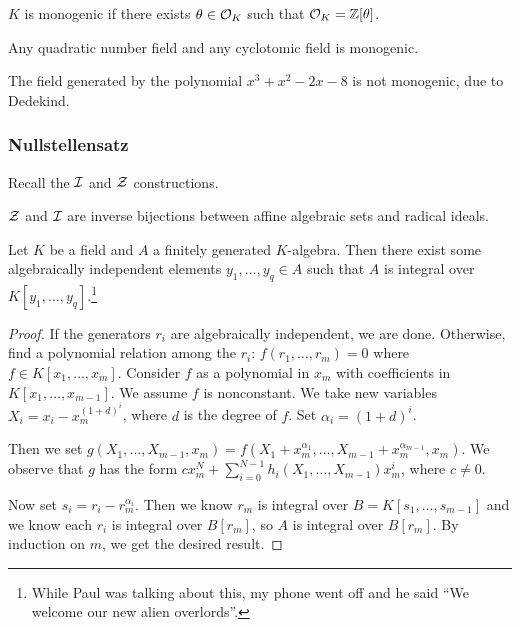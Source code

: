 \documentclass[10pt, twoside]{article}
\begin{document}
        \begin{defn}
            $K$ is monogenic if there exists $\theta \in \mathcal{O}_K$ such that $\mathcal{O}_K = \mathbb{Z}[\theta]$.
        \end{defn}

        \begin{exm}
            Any quadratic number field and any cyclotomic field is monogenic.
        \end{exm}
        \begin{exm}
            The field generated by the polynomial $x^3+x^2-2x-8$ is not monogenic, due to Dedekind.
        \end{exm}

        \subsubsection{Nullstellensatz}
        Recall the $\mathcal{I}$ and $\mathcal{Z}$ constructions.

        \begin{thm}
            $\mathcal{Z}$ and $\mathcal{I}$ are inverse bijections between affine algebraic sets and radical ideals.
        \end{thm}

        \begin{lem}
            Let $K$ be a field and $A$ a finitely generated $K$-algebra. Then there exist some algebraically independent elements $y_1, \ldots, y_q \in A$ such that $A$ is integral over $K[y_1, \ldots, y_q]$.\footnote{While Paul was talking about this, my phone went off and he said ``We welcome our new alien overlords''.}
            \begin{proof}
                If the generators $r_i$ are algebraically independent, we are done. Otherwise, find a polynomial relation among the $r_i$: $f(r_1, \ldots, r_m) = 0$ where $f \in K[x_1, \ldots, x_m]$. Consider $f$ as a polynomial in $x_m$ with coefficients in $K[x_1, \ldots, x_{m-1}]$. We assume $f$ is nonconstant. We take new variables $X_i = x_i-x_m^{(1+d)^i}$, where $d$ is the degree of $f$. Set $\alpha_i = (1+d)^i$.

                Then we set $g(X_1, \ldots, X_{m-1}, x_m) = f(X_1+x_m^{\alpha_1}, \ldots, X_{m-1} + x_m^{\alpha_{m-1}},x_m)$. We observe that $g$ has the form $cx_m^N + \sum_{i=0}^{N-1} h_i(X_1, \ldots, X_{m-1})x_m^i$, where $c \neq 0$.

                Now set $s_i = r_i - r_m^{\alpha_i}$. Then we know $r_m$ is integral over $B=K[s_1, \ldots, s_{m-1}]$ and we know each $r_i$ is integral over $B[r_m]$, so $A$ is integral over $B[r_m]$. By induction on $m$, we get the desired result.
            \end{proof}
        \end{lem}
\end{document}
